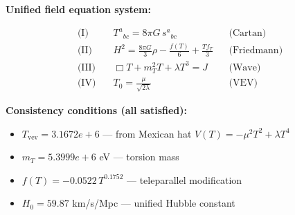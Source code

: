 
\textbf{Unified field equation system:}

\begin{align}
  \text{(I)} \quad & T^a{}_{bc} = 8\pi G \, s^a{}_{bc} && \text{(Cartan)} \\
  \text{(II)} \quad & H^2 = \frac{8\pi G}{3}\rho - \frac{f(T)}{6} + \frac{Tf_T}{3} && \text{(Friedmann)} \\
  \text{(III)} \quad & \Box T + m_T^2 T + \lambda T^3 = J && \text{(Wave)} \\
  \text{(IV)} \quad & T_0 = \frac{\mu}{\sqrt{2\lambda}} && \text{(VEV)}
\end{align}

\textbf{Consistency conditions (all satisfied):}
\begin{itemize}
  \item $T_{\text{vev}} = 3.1672e+6$ — from Mexican hat $V(T) = -\mu^2 T^2 + \lambda T^4$
  \item $m_T = 5.3999e+6$ eV — torsion mass
  \item $f(T) = -0.0522 \, T^{0.1752}$ — teleparallel modification
  \item $H_0 = 59.87$ km/s/Mpc — unified Hubble constant
\end{itemize}